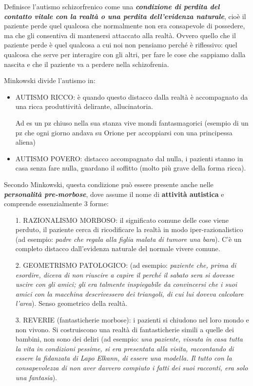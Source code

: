 Definisce l'autismo schizorfrenico come una \textbf{\emph{condizione di
perdita del contatto vitale con la realtà o una perdita dell'evidenza
naturale}}, cioè il paziente perde quel qualcosa che normalmente non era
consapevole di possedere, ma che gli consentiva di mantenersi attaccato
alla realtà. Ovvero quello che il paziente perde è quel qualcosa a cui
noi non pensiamo perché è riflessivo: quel qualcosa che serve per
interagire con gli altri, per fare le cose che sappiamo dalla nascita e
che il paziente va a perdere nella schizofrenia.

Minkowski divide l'autismo in:

\begin{itemize}
\item
  AUTISMO RICCO: è quando questo distacco dalla realtà è accompagnato da
  una ricca produttività delirante, allucinatoria.

Ad es un pz chiuso nella sua stanza vive mondi fantasmagorici (esempio
di un pz che ogni giorno andava su Orione per accoppiarsi con una
principessa aliena)

\item
  AUTISMO POVERO: distacco accompagnato dal nulla, i pazienti stanno in
  casa senza fare nulla, guardano il soffitto (molto più grave della
  forma ricca).
\end{itemize}

Secondo Minkowski, questa condizione può essere presente anche nelle
\textbf{\emph{personalità pre-morbose}}, dove assume il nome di
\textbf{attività autistica} e comprende essenzialmente 3 forme:

\begin{itemize}
\item[1.]
  RAZIONALISMO MORBOSO: il significato comune delle cose viene perduto,
  il paziente cerca di ricodificare la realtà in modo
  iper-razionalistico (ad esempio: \emph{padre che regala alla figlia
  malata di tumore una bara}). C'è un completo distacco dall'evidenza
  naturale del normale vivere comune.
\item[2.]
  GEOMETRISMO PATOLOGICO: (ad esempio: \emph{paziente che, prima di
  esordire, diceva di non riuscire a capire il perché il sabato sera si
  dovesse uscire con gli amici; gli era talmente inspiegabile da
  convincersi che i suoi amici con la macchina descrivessero dei
  triangoli, di cui lui doveva calcolare l'area}). Senso geometrico
  della realtà.
\item[3.]
  REVERIE (fantasticherie morbose): i pazienti si chiudono nel loro
  mondo e non vivono. Si costruiscono una realtà di fantasticherie
  simili a quelle dei bambini, non sono dei deliri (ad esempio:
  \emph{una paziente, vissuta in casa tutta la vita in condizioni
  pessime, si era presentata alla visita, raccontando di essere la
  fidanzata di Lapo Elkann, di essere una modella. Il tutto con la
  consapevolezza di non aver davvero compiuto i fatti dei suoi racconti,
  era solo una fantasia}).
\end{itemize}

